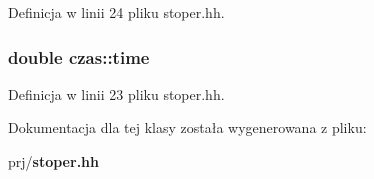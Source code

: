 \-Definicja w linii 24 pliku stoper.\-hh.

\subsubsection[{time}]{\setlength{\rightskip}{0pt plus 5cm}double {\bf czas\-::time}\hspace{0.3cm}{\ttfamily  [private]}}\label{classczas_a1348fd4948270410b3087bb0318bd147}


\-Definicja w linii 23 pliku stoper.\-hh.



\-Dokumentacja dla tej klasy została wygenerowana z pliku\-:\begin{DoxyCompactItemize}
\item 
prj/{\bf stoper.\-hh}\end{DoxyCompactItemize}

